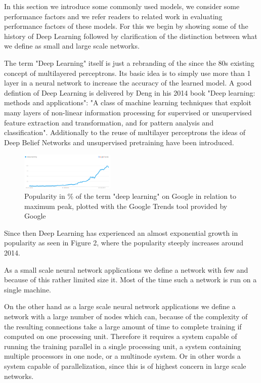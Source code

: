 \documentclass[conference]{IEEEtran}
\begin{document}

In this section we introduce some commonly used models, we consider some performance factors and we refer readers to related work in evaluating performance factors of these models. For this we begin by showing some of the history of Deep Learning followed by clarification of the distinction between what we define as small and large scale networks.

The term "Deep Learning" itself is just a rebranding of the since the 80s existing concept of multilayered perceptrons. Its basic idea is to simply use more than 1 layer in a neural network to increase the accuracy of the learned model\cite{deeplearning101}. A good defintion of Deep Learning is delivered by Deng in his 2014 book "Deep learning: methods and applications"\cite{deng2014deep}: "A class of machine learning techniques that exploit many layers of non-linear information processing for supervised or unsupervised feature extraction and transformation, and for pattern analysis and classification". Additionally to the reuse of multilayer perceptrons the ideas of Deep Belief Networks and unsupervised pretraining have been introduced.

\begin{figure}
\centering
\includegraphics[width=0.4\textwidth]{pop.png}
\caption{Popularity in \% of the term "deep learning" on Google in relation to maximum peak, plotted with the Google Trends tool provided by Google}
\end{figure}


Since then Deep Learning has experienced an almost exponential growth in popularity as seen in Figure 2, where the popularity steeply increases around 2014.


As a small scale neural network applications we define a network with few and because of this rather limited size it. Most of the time such a network is run on a single machine.



On the other hand as a large scale neural network applications we define a network with a large number of nodes which can, because of the complexity of the resulting connections take a large amount of time to complete training if computed on one processing unit. Therefore it requires a system capable of running the training parallel in a single processing unit, a system containing multiple processors in one node, or a multinode system. Or in other words a system capable of parallelization, since this is of highest concern in large scale networks.
\end{document}
